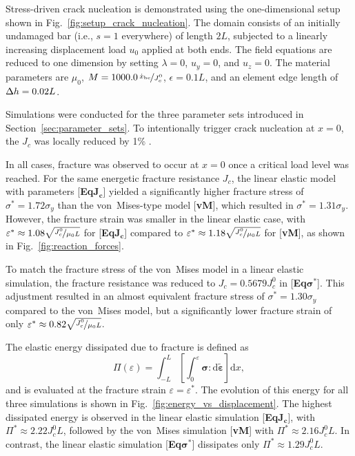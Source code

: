 \documentclass[pdflatex,sn-mathphys-num]{sn-jnl}%
\newcommand{\vMLabel}{[\textbf{vM}]\xspace}
\newcommand{\EqJcLabel}{[\textbf{Eq$\boldsymbol{J_c}$}]\xspace}
\newcommand{\EqSigmaStarLabel}{[\textbf{Eq$\boldsymbol{\sigma^*}$}]\xspace}
\theoremstyle{thmstyleone}%
\theoremstyle{thmstyletwo}%
\theoremstyle{thmstylethree}%
\begin{document}
Stress-driven crack nucleation is demonstrated using the one-dimensional setup shown in Fig.~\ref{fig:setup_crack_nucleation}. The domain consists of an initially undamaged bar (i.e., $s = 1$ everywhere) of length $2L$, subjected to a linearly increasing displacement load $u_0$ applied at both ends. The field equations are reduced to one dimension by setting $\lambda = 0$, $u_y = 0$, and $u_z = 0$. The material parameters are $\mu_0$, $M = 1000.0\,\nicefrac{\dot{x}_{\text{bc}}}{J_c^0}$, $\epsilon = 0.1L$, and an element edge length of $\Delta h = \deleted{0.01L}\added{0.02L}$.

Simulations were conducted for the three parameter sets introduced in Section~\ref{sec:parameter_sets}. To intentionally trigger crack nucleation at $x = 0$, the  $J_c$ was locally reduced by 1\% .

In all cases, fracture was observed to occur at $x = 0$ once a critical load level was 
reached. For the same energetic fracture resistance $J_c$, the linear elastic model with parameters \EqJcLabel yielded a significantly higher fracture stress of $\sigma^* = 1.72\sigma_y$ than the von~Mises-type model \vMLabel, which resulted in $\sigma^* = 1.31\sigma_y$. However, the fracture strain was smaller in the linear elastic case, with $\varepsilon^* \approx 1.08\sqrt{\nicefrac{J_c^0}{\mu_0 L}}$ for \EqJcLabel compared to $\varepsilon^* \approx 1.18\sqrt{\nicefrac{J_c^0}{\mu_0 L}}$ for \vMLabel, as shown in Fig.~\ref{fig:reaction_forces}.

To match the fracture stress of the von~Mises model in a linear elastic simulation, the fracture resistance was reduced to $J_c = 0.5679J_c^0$ in \EqSigmaStarLabel. This adjustment resulted in an almost equivalent fracture stress of $\sigma^* = 1.30\sigma_y$ compared to the von~Mises model, but a significantly lower fracture strain of only $\varepsilon^* \approx 0.82\sqrt{\nicefrac{J_c^0}{\mu_0 L}}$.

The elastic energy dissipated due to fracture is defined as
\begin{equation}
   \Pi(\varepsilon) = \int_{-L}^{L}
   \left[\int_{0}^{\varepsilon} \boldsymbol{\sigma} :
   \mathrm{d}\tilde{\boldsymbol{\varepsilon}}\right] \mathrm{d}x,
   \label{eq:total_energy}
\end{equation}
and is evaluated at the fracture strain $\varepsilon = \varepsilon^*$. The evolution of this energy for all three simulations is shown in Fig.~\ref{fig:energy_vs_displacement}. The highest dissipated energy is observed in the linear elastic simulation \EqJcLabel, with $\Pi^* \approx 2.22J_c^0 L$, followed by the von~Mises simulation \vMLabel with $\Pi^* \approx 2.16J_c^0 L$. In contrast, the linear elastic simulation \EqSigmaStarLabel dissipates only $\Pi^* \approx 1.29J_c^0 L$.
\end{document}
